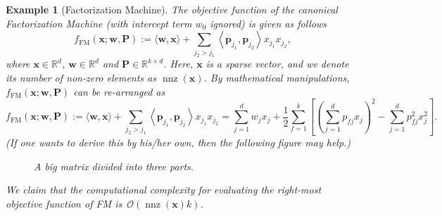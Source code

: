 \documentclass[twoside]{article}
\newtheorem{example}[theorem]{Example}
\begin{document}
\begin{example}[Factorization Machine]\normalfont
    The objective function of the canonical Factorization Machine (with intercept term $w_{0}$ ignored) is given as follows
$$
f_{\mathrm{FM}}(\boldsymbol{x} ; \boldsymbol{w}, \boldsymbol{P}):=\langle\boldsymbol{w}, \boldsymbol{x}\rangle+\sum_{j_{2}>j_{1}}\left\langle \boldsymbol{p}_{j_{1}}, \boldsymbol{p}_{j_{2}}\right\rangle x_{j_{1}} x_{j_{2}},
$$
where $\boldsymbol{x}\in\mathbb{R}^{d}$, $\boldsymbol{w}\in\mathbb{R}^{d}$ and $\boldsymbol{P}\in\mathbb{R}^{k\times d}$. Here, $\boldsymbol{x}$ is a sparse vector, and we denote its number of non-zero elements as $\operatorname{nnz}(\boldsymbol{x})$. By mathematical manipulations, $f_{\mathrm{FM}}(\boldsymbol{x} ; \boldsymbol{w}, \boldsymbol{P})$ can be re-arranged as
$$
f_{\mathrm{FM}}(\boldsymbol{x} ; \boldsymbol{w}, \boldsymbol{P}):=\langle\boldsymbol{w}, \boldsymbol{x}\rangle+\sum_{j_{2}>j_{1}}\left\langle \boldsymbol{p}_{j_{1}}, \boldsymbol{p}_{j_{2}}\right\rangle x_{j_{1}} x_{j_{2}}=\sum_{j=1}^{d}w_{j}x_{j}+\frac{1}{2} \sum_{f=1}^{k}\left[\left(\sum_{j=1}^{d} p_{fj} x_{j}\right)^{2}-\sum_{j=1}^{d} p_{fj}^{2} x_{j}^{2}\right].
$$
(If one wants to derive this by his/her own, then the following figure may help.)
\begin{figure}[!ht]
\centering
{}
\vspace{-6em}
\caption{A big matrix divided into three parts.}
\end{figure}

We claim that the computational complexity for evaluating the right-most objective function of FM is~$\mathcal{O}(\operatorname{nnz}(\boldsymbol{x})k)$.
\end{example}
\end{document}
